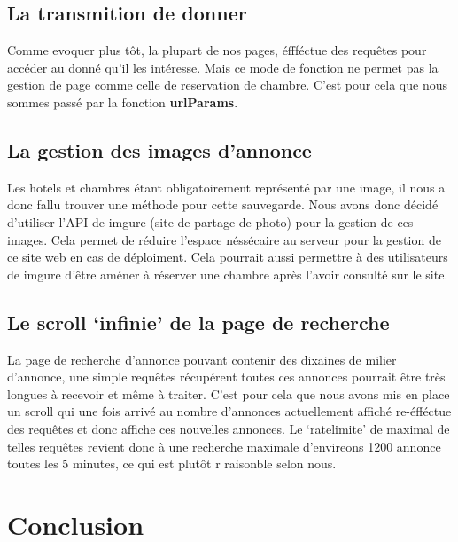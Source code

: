 \documentclass[12pt]{article}
\begin{document}
    \subsection{La transmition de donner}

    Comme evoquer plus tôt, la plupart de nos pages, éffféctue des requêtes pour 
    accéder au donné qu'il les intéresse. Mais ce mode de fonction ne permet 
    pas la gestion de page comme celle de reservation de chambre. C'est pour 
    cela que nous sommes passé par la fonction \textbf{urlParams}.

    \subsection{La gestion des images d'annonce}

    Les hotels et chambres étant obligatoirement représenté par une image, il 
    nous a donc fallu trouver une méthode pour cette sauvegarde. Nous avons 
    donc décidé d'utiliser l'API de imgure (site de partage de photo) pour la 
    gestion de ces images. Cela permet de réduire l'espace néssécaire au serveur 
    pour la gestion de ce site web en cas de déploiment. Cela pourrait aussi 
    permettre à des utilisateurs de imgure d'être améner à réserver une chambre 
    après l'avoir consulté sur le site. 

    \subsection{Le scroll `infinie' de la page de recherche}

    La page de recherche d'annonce pouvant contenir des dixaines de milier 
    d'annonce, une simple requêtes récupérent toutes ces annonces pourrait être 
    très longues à recevoir et même à traiter. C'est pour cela que nous avons 
    mis en place un scroll qui une fois arrivé au nombre d'annonces actuellement 
    affiché re-éfféctue des requêtes et donc affiche ces nouvelles annonces. Le 
    `ratelimite' de maximal de telles requêtes revient donc à une recherche
    maximale d'envireons 1200 annonce toutes les 5 minutes, ce qui est plutôt r
    raisonble selon nous. 

    \newpage

    \section{Conclusion}
\end{document}
